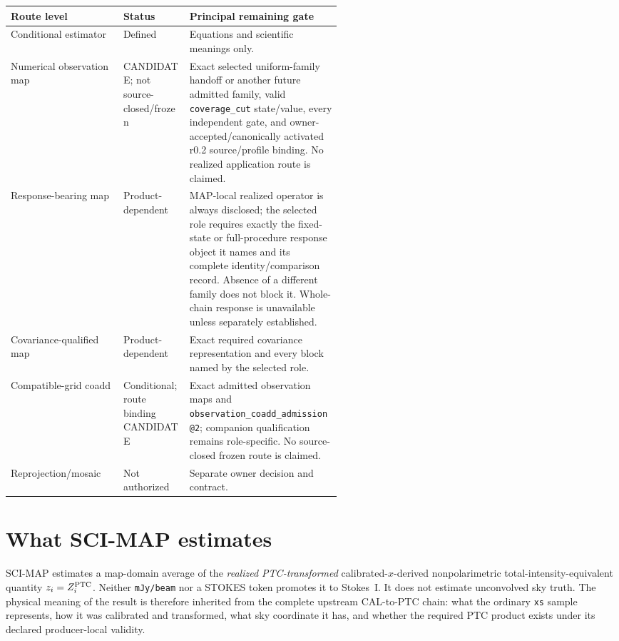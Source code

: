 \documentclass[10pt]{article}
\newcommand{\code}[1]{\nolinkurl{#1}}
\begin{document}
\begin{center}\small
\begin{tabularx}{0.96\linewidth}{@{}L{0.34\linewidth}L{0.20\linewidth}Y@{}}
\toprule Route level & Status & Principal remaining gate \\
\midrule
Conditional estimator & Defined & Equations and scientific meanings only.\\
Numerical observation map & CANDIDATE; not source-closed/frozen & Exact selected uniform-family handoff or another future admitted family, valid \code{coverage_cut} state/value, every independent gate, and owner-accepted/canonically activated r0.2 source/profile binding. No realized application route is claimed.\\
Response-bearing map & Product-dependent & MAP-local realized operator is always disclosed; the selected role requires exactly the fixed-state or full-procedure response object it names and its complete identity/comparison record. Absence of a different family does not block it. Whole-chain response is unavailable unless separately established.\\
Covariance-qualified map & Product-dependent & Exact required covariance representation and every block named by the selected role.\\
Compatible-grid coadd & Conditional; route binding CANDIDATE & Exact admitted observation maps and \code{observation_coadd_admission@2}; companion qualification remains role-specific. No source-closed frozen route is claimed.\\
Reprojection/mosaic & Not authorized & Separate owner decision and contract.\\
\bottomrule
\end{tabularx}
\end{center}

\SCIMapLifecycleDefinition

\SCIMapLifecycleTable

\SCIMapAxisSeparationDefinition

\SCIMapLifecycleAssumption

\tableofcontents

\clearpage
\section{What SCI-MAP estimates}\label{sec:estimand}
SCI-MAP estimates a map-domain average of the \emph{realized PTC-transformed}
calibrated-\(x\)-derived nonpolarimetric total-intensity-equivalent quantity
\(z_i=Z_i^{\rm PTC}\). Neither \code{mJy/beam} nor a STOKES token promotes it
to Stokes~I. It does not estimate unconvolved sky truth. The physical
meaning of the result is therefore inherited from the complete upstream
CAL-to-PTC chain: what the ordinary \code{xs} sample represents, how it was
calibrated and transformed, what sky coordinate it has, and whether the
required PTC product exists under its declared producer-local validity.
\end{document}
